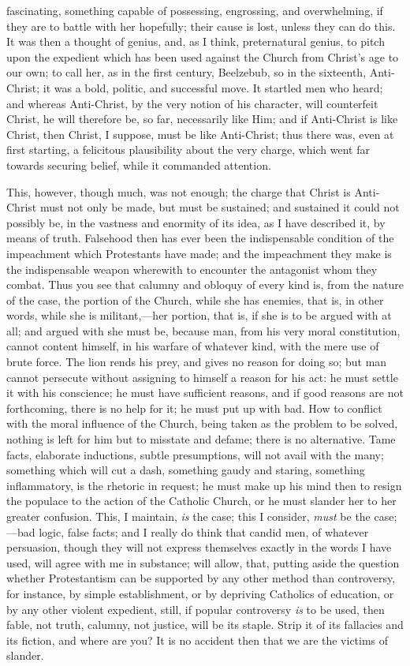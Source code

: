 fascinating, something capable of possessing, engrossing,
and overwhelming, if they are to battle with her
hopefully; their cause is lost, unless they can do this.
It was then a thought of genius, and, as I think,
preternatural genius, to pitch upon the expedient which
has been used against the Church from Christ's age to our
own; to call her, as in the first century, Beelzebub, so
in the sixteenth, Anti-Christ; it was a bold, politic,
and successful move. It startled men who heard; and
whereas Anti-Christ, by the very notion of his character,
will counterfeit Christ, he will therefore be, so far,
necessarily like Him; and if Anti-Christ is like Christ,
then Christ, I suppose, must be like Anti-Christ; thus
there was, even at first starting, a felicitous
plausibility about the very charge, which went far
towards securing belief, while it commanded attention.

This, however, though much, was not enough; the charge
that Christ is Anti-Christ must not only be made, but
must be sustained; and sustained it could not possibly
be, in the vastness and enormity of its idea, as I have
described it, by means of truth. Falsehood then has ever
been the indispensable condition of the impeachment which
Protestants have made; and the impeachment they make is
the indispensable weapon wherewith to encounter the
antagonist whom they combat. Thus you see that calumny
and obloquy of every kind is, from the nature of the
case, the portion of the Church, while she has enemies,
that is, in other words, while she is militant,—her
portion, that is, if she is to be argued with at all; and
argued with she must be, because man, from his very moral
constitution, cannot content himself, in his warfare of
whatever kind, with the mere use of brute force. The lion
rends his prey, and gives no reason for doing so; but man
cannot persecute without assigning to himself a reason
for his act: he must settle it with his conscience; he
must have sufficient reasons, and if good reasons are not
forthcoming, there is no help for it; he must put up with
bad. How to conflict with the moral influence of the
Church, being taken as the problem to be solved, nothing
is left for him but to misstate and defame; there is no
alternative. Tame facts, elaborate inductions, subtle
presumptions, will not avail with the many; something
which will cut a dash, something gaudy and staring,
something inflammatory, is the rhetoric in request; he
must make up his mind then to resign the populace to the
action of the Catholic Church, or he must slander her to
her greater confusion. This, I maintain, \emph{is} the case;
this I consider, \emph{must} be the case;—bad
logic, false facts; and I really do think that candid
men, of whatever persuasion, though they will not express
themselves exactly in the words I have used, will agree
with me in substance; will allow, that, putting aside the
question whether Protestantism can be supported by any
other method than controversy, for instance, by simple
establishment, or by depriving Catholics of education, or
by any other violent expedient, still, if popular
controversy \emph{is} to be used, then fable, not
truth, calumny, not justice, will be its staple. Strip it
of its fallacies and its fiction, and where are you? It
is no accident then that we are the victims of slander.

